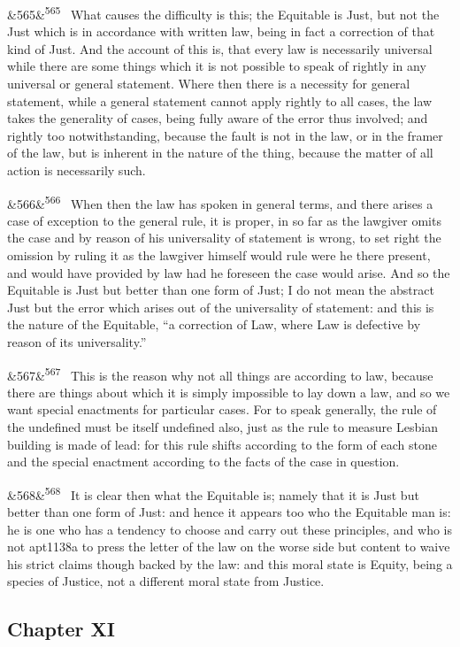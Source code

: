 \documentclass[12pt]{article}
\newcommand{\para}[1][]{\par\noindent\ifx&#1&\else\textsuperscript{\footnotesize #1}~\fi}
\begin{document}
\para[565] What causes the difficulty is this; the Equitable is Just, but not the Just which is in accordance with written law, being in fact a correction of that kind of Just. And the account of this is, that every law is necessarily universal while there are some things which it is not possible to speak of rightly in any universal or general statement. Where then there is a necessity for general statement, while a general statement cannot apply rightly to all cases, the law takes the generality of cases, being fully aware of the error thus involved; and rightly too notwithstanding, because the fault is not in the law, or in the framer of the law, but is inherent in the nature of the thing, because the matter of all action is necessarily such.

\para[566] When then the law has spoken in general terms, and there arises a case of exception to the general rule, it is proper, in so far as the lawgiver omits the case and by reason of his universality of statement is wrong, to set right the omission by ruling it as the lawgiver himself would rule were he there present, and would have provided by law had he foreseen the case would arise. And so the Equitable is Just but better than one form of Just; I do not mean the abstract Just but the error which arises out of the universality of statement: and this is the nature of the Equitable, “a correction of Law, where Law is defective by reason of its universality.”

\para[567] This is the reason why not all things are according to law, because there are things about which it is simply impossible to lay down a law, and so we want special enactments for particular cases. For to speak generally, the rule of the undefined must be itself undefined also, just as the rule to measure Lesbian building is made of lead: for this rule shifts according to the form of each stone and the special enactment according to the facts of the case in question.

\para[568] It is clear then what the Equitable is; namely that it is Just but better than one form of Just: and hence it appears too who the Equitable man is: he is one who has a tendency to choose and carry out these principles, and who is not apt1138a to press the letter of the law on the worse side but content to waive his strict claims though backed by the law: and this moral state is Equity, being a species of Justice, not a different moral state from Justice.

\subsection*{Chapter XI}
\end{document}
